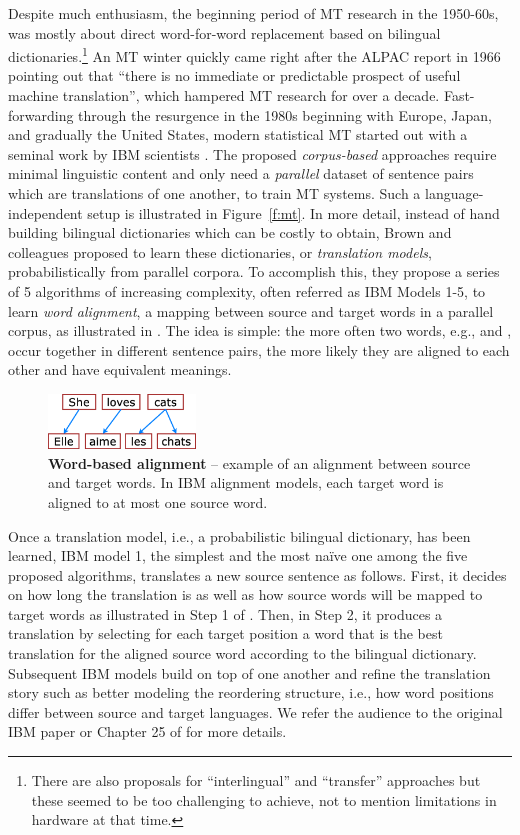 Despite much enthusiasm, the beginning period of MT research in the 1950-60s,
was mostly about direct word-for-word replacement based on bilingual
dictionaries.\footnote{There are also proposals for ``interlingual'' and
``transfer'' approaches but these seemed to be too challenging to achieve, not
to mention limitations in hardware at that time\cite{hutchins07}.} An MT winter quickly came
right after the ALPAC report in 1966 pointing out that ``there is no immediate
or predictable prospect of useful machine translation'', which hampered MT
research for over a
decade. Fast-forwarding through the resurgence in the 1980s beginning with
Europe, Japan, and gradually the United States,
modern statistical MT started out with a seminal work by IBM scientists
\cite{Brown:1993:MSM}. The proposed {\it corpus-based} approaches require
minimal linguistic content and only need a {\it parallel} dataset of
sentence pairs which are translations of one
another, to train MT systems.
Such a language-independent setup is illustrated in Figure~\ref{f:mt}. 
In more
detail, instead of hand building bilingual dictionaries which can be costly to
obtain, Brown and colleagues proposed to learn these dictionaries, or {\it
translation models}, probabilistically from parallel corpora. To accomplish
this, they propose a series of 5 algorithms of increasing complexity, often
referred as IBM Models 1-5, to learn {\it word alignment},
a mapping between source and target words in a parallel corpus, as illustrated
in . The idea is
simple: the more often two words, e.g.,  and , occur
together in different sentence pairs, the more likely they are aligned to each
other and have equivalent meanings.

\begin{figure}[tbh!]
\centering
\includegraphics[width=0.35\textwidth, clip=true, trim= 0 0 0
0]{img/wordalign.eps}
\caption[Word-based alignment]{{\bf Word-based alignment} -- example of
an alignment between source and target words. In IBM
alignment models, each target word is aligned to at most one source word.
} 
\label{f:wordalign}
\end{figure}

Once a translation model, i.e., a probabilistic bilingual dictionary, has been
learned, IBM model 1, the simplest and the most na\"{i}ve one among the five proposed
algorithms, translates a new source sentence as follows. First, it decides on
how long the translation is as well as how source words will be mapped to target
words as illustrated in Step 1 of . Then,
in Step 2, it produces a translation by selecting for each target position a
word that is the best translation for the aligned source word according to the
bilingual dictionary. Subsequent IBM models build on top of one another and refine the
translation story such as better modeling the reordering structure, i.e., how
word positions differ between source and target languages. We refer the audience to
the original IBM paper or Chapter 25 of \cite{Jurafsky:2009} for more details.

